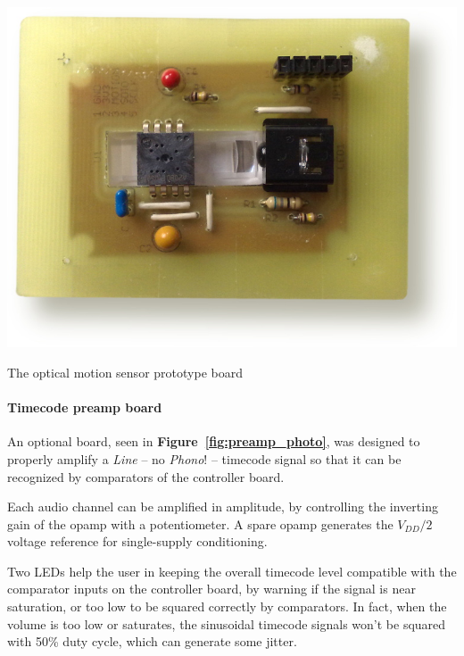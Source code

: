 \documentclass[a4paper,10pt]{article}
\makeatletter
\newenvironment{figurehere}{\def\@captype{figure}\vspace{2ex}}{\vspace{2ex}}
\newcommand{\citef}[1]{\textbf{Figure~\ref{#1}}}
\makeatother
\begin{document}
\begin{multicols}{2}
\begin{figurehere}
	\centering
	\includegraphics[keepaspectratio=true,width=\columnwidth]{images/sensor_photo.jpg}
	\caption{The optical motion sensor prototype board}
	\label{fig:sensor_photo}
\end{figurehere}


\paragraph{Timecode preamp board}
An optional board, seen in \citef{fig:preamp_photo}, was designed to properly
amplify a \emph{Line} -- no \emph{Phono}! -- timecode signal so that it can be
recognized by comparators of the controller board.

Each audio channel can be amplified in amplitude, by controlling the inverting
gain of the opamp with a potentiometer. A spare opamp generates the $V_{DD}/2$
voltage reference for single-supply conditioning.

Two LEDs help the user in keeping the overall timecode level compatible with
the comparator inputs on the controller board, by warning if the signal is
near saturation, or too low to be squared correctly by comparators.
In fact, when the volume is too low or saturates, the sinusoidal timecode
signals won't be squared with 50\% duty cycle, which can generate some jitter.


\end{multicols}
\end{document}
